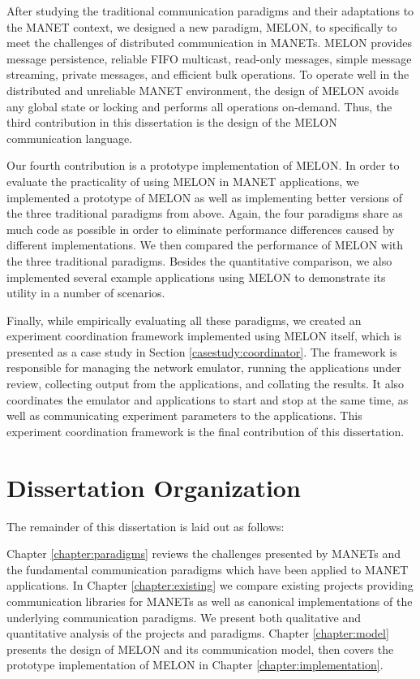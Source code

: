After studying the traditional communication paradigms and their adaptations to the MANET context, we designed a new paradigm, MELON, to specifically to meet the challenges of distributed communication in MANETs. MELON provides message persistence, reliable FIFO multicast, read-only messages, simple message streaming, private messages, and efficient bulk operations. To operate well in the distributed and unreliable MANET environment, the design of MELON avoids any global state or locking and performs all operations on-demand. Thus, the third contribution in this dissertation is the design of the MELON communication language.

Our fourth contribution is a prototype implementation of MELON. In order to evaluate the practicality of using MELON in MANET applications, we implemented a prototype of MELON as well as implementing better versions of the three traditional paradigms from above. Again, the four paradigms share as much code as possible in order to eliminate performance differences caused by different implementations. We then compared the performance of MELON with the three traditional paradigms. Besides the quantitative comparison, we also implemented several example applications using MELON to demonstrate its utility in a number of scenarios.

Finally, while empirically evaluating all these paradigms, we created an experiment coordination framework implemented using MELON itself, which is presented as a case study in Section \ref{casestudy:coordinator}. The framework is responsible for managing the network emulator, running the applications under review, collecting output from the applications, and collating the results. It also coordinates the emulator and applications to start and stop at the same time, as well as communicating experiment parameters to the applications. This experiment coordination framework is the final contribution of this dissertation.

\section{Dissertation Organization}

The remainder of this dissertation is laid out as follows:

Chapter \ref{chapter:paradigms} reviews the challenges presented by MANETs and the fundamental communication paradigms which have been applied to MANET applications. In Chapter \ref{chapter:existing} we compare existing projects providing communication libraries for MANETs as well as canonical implementations of the underlying communication paradigms. We present both qualitative and quantitative analysis of the projects and paradigms. Chapter \ref{chapter:model} presents the design of MELON and its communication model, then covers the prototype implementation of MELON in Chapter \ref{chapter:implementation}.

